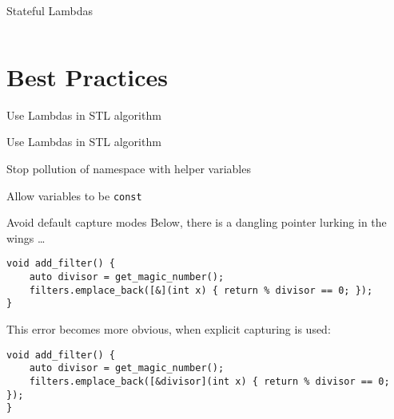 \begin{frame}[fragile]{Stateful Lambdas}
    \begin{columns}[t]
        \begin{column}{.6\textwidth}
        \end{column}
        \begin{column}{.35\textwidth}
        \end{column}
    \end{columns}
\end{frame}

\begin{frame}
    \centering
    \scalebox{3}{Best Practices}

\end{frame}

\section{Best Practices}

\begin{frame}[fragile]{Use Lambdas in STL algorithm}
\end{frame}

\begin{frame}[fragile]{Use Lambdas in STL algorithm}
\end{frame}

\begin{frame}[fragile]{Stop pollution of namespace with helper variables}
\end{frame}

\begin{frame}[fragile]{Allow variables to be \texttt{const}}
\end{frame}

\begin{frame}[fragile]{Avoid default capture modes}
    Below, there is a dangling pointer lurking in the wings \ldots
    \begin{lstlisting}
void add_filter() {
    auto divisor = get_magic_number();
    filters.emplace_back([&](int x) { return % divisor == 0; });
}
    \end{lstlisting}

    This error becomes more obvious, when explicit capturing is used:
    \begin{lstlisting}
void add_filter() {
    auto divisor = get_magic_number();
    filters.emplace_back([&divisor](int x) { return % divisor == 0; });
}
    \end{lstlisting}
\end{frame}

